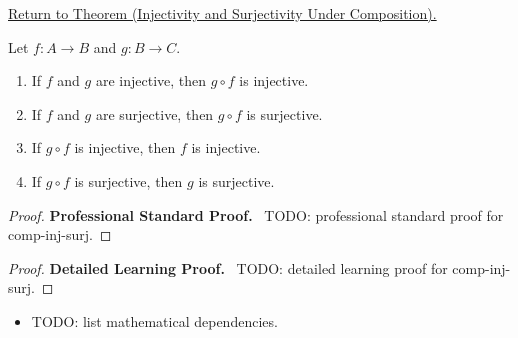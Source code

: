 \newpage
{}
\label{prf:comp-inj-surj}

\begin{remark*}[Return]
\hyperref[thm:comp-inj-surj]{Return to Theorem (Injectivity and Surjectivity Under Composition).}
\end{remark*}

\begin{theorem*}
Let $f : A \to B$ and $g : B \to C$.
\begin{enumerate}[label=(\roman*)]
\item If $f$ and $g$ are injective, then $g \circ f$ is injective.
\item If $f$ and $g$ are surjective, then $g \circ f$ is surjective.
\item If $g \circ f$ is injective, then $f$ is injective.
\item If $g \circ f$ is surjective, then $g$ is surjective.
\end{enumerate}
\end{theorem*}

\begin{proof}
\textbf{Professional Standard Proof.}~
TODO: professional standard proof for comp-inj-surj.
\end{proof}

\begin{proof}
\textbf{Detailed Learning Proof.}~
TODO: detailed learning proof for comp-inj-surj.
\end{proof}

\begin{remark*}
\end{remark*}

\begin{dependencies}
\begin{itemize}
  \item TODO: list mathematical dependencies.
\end{itemize}
\end{dependencies}

\clearpage
